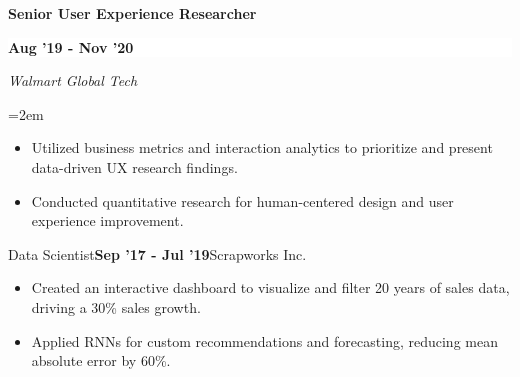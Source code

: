 \documentclass[paper=letter,fontsize=10.4pt]{scrartcl} %
\newcommand{\EducationEntry}[5]{
		\noindent \textbf{#1} \hfill      %
		\colorbox{White}{%
			\parbox{10em}{%
            \hfill\color{Black}#2}} \par  %
		\noindent \textit{#3} \par        %
		\noindent\hangindent=2em\hangafter=0 \small #4 %
		\normalsize \par}
\begin{document}
\EducationEntry{Senior User Experience Researcher}{\textbf{Aug '19 - Nov '20}}{Walmart Global Tech}{
\begin{itemize}
    \setlength\itemsep{0.05em}
    \item Utilized business metrics and interaction analytics to prioritize and present data-driven UX research findings.
    \item Conducted quantitative research for human-centered design and user experience improvement.
\end{itemize}
}

\EducationEntry{Data Scientist}{\textbf{Sep '17 - Jul '19}}{Scrapworks Inc.}{
\begin{itemize}
    \setlength\itemsep{0.05em}
    \item Created an interactive dashboard to visualize and filter 20 years of sales data, driving a 30\% sales growth.
    \item Applied RNNs for custom recommendations and forecasting, reducing mean absolute error by 60\%.
\end{itemize}
}
\end{document}
